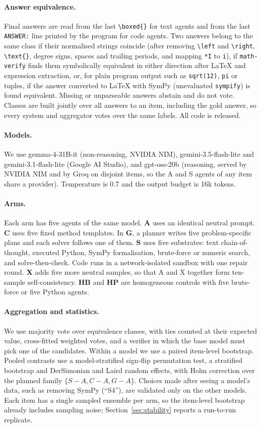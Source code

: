\documentclass[11pt]{article}
\begin{document}
\paragraph{Answer equivalence.} Final answers are read from the last \verb|\boxed{}| for text
agents and from the last \verb|ANSWER:| line printed by the program for code agents. Two answers
belong to the same class if their normalised strings coincide (after removing \verb|\left| and
\verb|\right|, \verb|\text{}|, degree signs, spaces and trailing periods, and mapping \verb|*I|
to \verb|i|), if \texttt{math-verify} finds them symbolically equivalent in either direction
after LaTeX and expression extraction, or, for plain program output such as \verb|sqrt(12)|,
\verb|pi| or tuples, if the answer converted to LaTeX with SymPy (unevaluated \verb|sympify|)
is found equivalent. Missing or unparseable answers abstain and do not vote. Classes are built
jointly over all answers to an item, including the gold answer, so every system and aggregator
votes over the same labels. All code is released.
\paragraph{Models.} We use gemma-4-31B-it (non-reasoning, NVIDIA NIM), gemini-3.5-flash-lite and
gemini-3.1-flash-lite (Google AI Studio), and gpt-oss-20b (reasoning, served by NVIDIA NIM and by
Groq on disjoint items, so the A and S agents of any item share a provider). Temperature is 0.7
and the output budget is 16k tokens.
\paragraph{Arms.} Each arm has five agents of the same model. \textbf{A} uses an identical
neutral prompt. \textbf{C} uses five fixed method templates. In \textbf{G}, a planner writes five
problem-specific plans and each solver follows one of them. \textbf{S} uses five substrates:
text chain-of-thought, executed Python, SymPy formalisation, brute-force or numeric search, and
solve-then-check. Code runs in a network-isolated sandbox with one repair round. \textbf{X} adds
five more neutral samples, so that A and X together form ten-sample self-consistency.
\textbf{HB} and \textbf{HP} are homogeneous controls with five brute-force or five Python agents.
\paragraph{Aggregation and statistics.} We use majority vote over equivalence classes, with
ties counted at their expected value, cross-fitted weighted votes, and a verifier in which the
base model must pick one of the candidates. Within a model we use a paired item-level bootstrap.
Pooled contrasts use a model-stratified sign-flip permutation test, a stratified bootstrap and
DerSimonian and Laird random effects, with Holm correction over the planned family
$\{S{-}A, C{-}A, G{-}A\}$. Choices made after seeing a model's data, such as removing SymPy
(``S4''), are validated only on the other models. Each item has a single sampled ensemble per
arm, so the item-level bootstrap already includes sampling noise; Section~\ref{sec:stability}
reports a run-to-run replicate.
\end{document}
